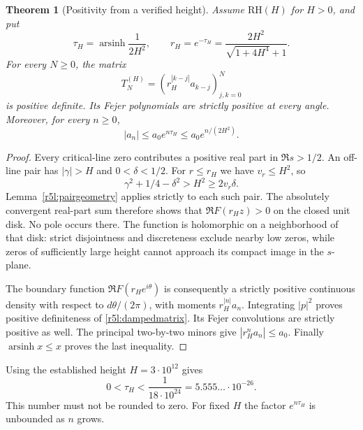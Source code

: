 \documentclass[11pt,a4paper]{article}
\newtheorem{theorem}{Theorem}[section]
\theoremstyle{definition}\newtheorem{definition}[theorem]{Definition}
\theoremstyle{remark}\newtheorem{remark}[theorem]{Remark}
\numberwithin{equation}{section}
\begin{document}
\begin{theorem}[Positivity from a verified height]
\label{r5l:damped}
Assume $\mathrm{RH}(H)$ for $H>0$, and put
\begin{equation}\label{r5l:taudef}
 \tau_H=\operatorname{arsinh}\frac1{2H^2},\qquad
 r_H=e^{-\tau_H}
     =\frac{2H^2}{\sqrt{1+4H^4}+1}.
\end{equation}
For every $N\ge0$, the matrix
\begin{equation}\label{r5l:dampedmatrix}
 T_N^{(H)}=(r_H^{|k-j|}a_{k-j})_{j,k=0}^N
\end{equation}
is positive definite.  Its Fejer polynomials are strictly positive
at every angle.  Moreover, for every $n\ge0$,
\begin{equation}\label{r5l:allnbound}
 |a_n|\le a_0e^{n\tau_H}\le a_0e^{n/(2H^2)}.
\end{equation}
\end{theorem}
\begin{proof}
Every critical-line zero contributes a positive real part in
$\Re s>1/2$.  An off-line pair has $|\gamma|>H$ and
$0<\delta<1/2$.  For $r\le r_H$ we have $v_r\le H^2$, so
\[
 \gamma^2+1/4-\delta^2>H^2\ge2v_r\delta.
\]
Lemma~\ref{r5l:pairgeometry} applies strictly to each such pair.
The absolutely convergent real-part sum therefore shows that
$\Re F(r_Hz)>0$ on the closed unit disk.  No pole occurs there.
The function is holomorphic on a neighborhood of that disk:
strict disjointness and discreteness exclude nearby low zeros,
while zeros of sufficiently large height cannot approach its
compact image in the $s$-plane.

The boundary function $\Re F(r_He^{i\theta})$ is consequently a
strictly positive continuous density with respect to $d\theta/(2\pi)$, with moments
$r_H^{|n|}a_n$.  Integrating $|p|^2$ proves positive definiteness
of \eqref{r5l:dampedmatrix}.  Its Fejer convolutions are strictly
positive as well.  The principal two-by-two minors give
$|r_H^na_n|\le a_0$.  Finally $\operatorname{arsinh}x\le x$
proves the last inequality.
\end{proof}

Using the established height $H=3\cdot10^{12}$ gives
\begin{equation}\label{r5l:numerictau}
 0<\tau_H<\frac1{18\cdot10^{24}}
       =5.555\ldots\cdot10^{-26}.
\end{equation}
This number must not be rounded to zero.  For fixed $H$ the factor
$e^{n\tau_H}$ is unbounded as $n$ grows.
\end{document}
